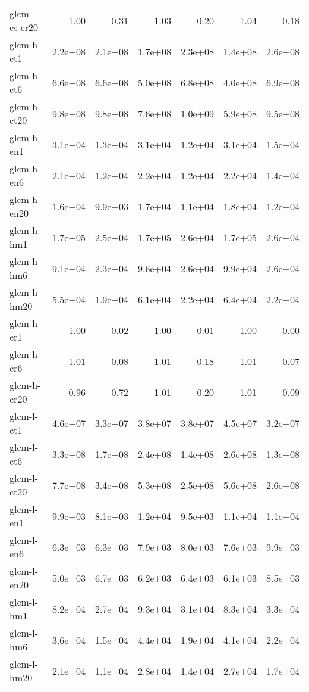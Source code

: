 \begin{tabular}{lrrrrrr}
glcm-cs-cr20        &    1.00 &    0.31 &    1.03 &    0.20 &    1.04 &    0.18 \\
glcm-h-ct1          & 2.2e+08 & 2.1e+08 & 1.7e+08 & 2.3e+08 & 1.4e+08 & 2.6e+08 \\
glcm-h-ct6          & 6.6e+08 & 6.6e+08 & 5.0e+08 & 6.8e+08 & 4.0e+08 & 6.9e+08 \\
glcm-h-ct20         & 9.8e+08 & 9.8e+08 & 7.6e+08 & 1.0e+09 & 5.9e+08 & 9.5e+08 \\
glcm-h-en1          & 3.1e+04 & 1.3e+04 & 3.1e+04 & 1.2e+04 & 3.1e+04 & 1.5e+04 \\
glcm-h-en6          & 2.1e+04 & 1.2e+04 & 2.2e+04 & 1.2e+04 & 2.2e+04 & 1.4e+04 \\
glcm-h-en20         & 1.6e+04 & 9.9e+03 & 1.7e+04 & 1.1e+04 & 1.8e+04 & 1.2e+04 \\
glcm-h-hm1          & 1.7e+05 & 2.5e+04 & 1.7e+05 & 2.6e+04 & 1.7e+05 & 2.6e+04 \\
glcm-h-hm6          & 9.1e+04 & 2.3e+04 & 9.6e+04 & 2.6e+04 & 9.9e+04 & 2.6e+04 \\
glcm-h-hm20         & 5.5e+04 & 1.9e+04 & 6.1e+04 & 2.2e+04 & 6.4e+04 & 2.2e+04 \\
glcm-h-cr1          &    1.00 &    0.02 &    1.00 &    0.01 &    1.00 &    0.00 \\
glcm-h-cr6          &    1.01 &    0.08 &    1.01 &    0.18 &    1.01 &    0.07 \\
glcm-h-cr20         &    0.96 &    0.72 &    1.01 &    0.20 &    1.01 &    0.09 \\
glcm-l-ct1          & 4.6e+07 & 3.3e+07 & 3.8e+07 & 3.8e+07 & 4.5e+07 & 3.2e+07 \\
glcm-l-ct6          & 3.3e+08 & 1.7e+08 & 2.4e+08 & 1.4e+08 & 2.6e+08 & 1.3e+08 \\
glcm-l-ct20         & 7.7e+08 & 3.4e+08 & 5.3e+08 & 2.5e+08 & 5.6e+08 & 2.6e+08 \\
glcm-l-en1          & 9.9e+03 & 8.1e+03 & 1.2e+04 & 9.5e+03 & 1.1e+04 & 1.1e+04 \\
glcm-l-en6          & 6.3e+03 & 6.3e+03 & 7.9e+03 & 8.0e+03 & 7.6e+03 & 9.9e+03 \\
glcm-l-en20         & 5.0e+03 & 6.7e+03 & 6.2e+03 & 6.4e+03 & 6.1e+03 & 8.5e+03 \\
glcm-l-hm1          & 8.2e+04 & 2.7e+04 & 9.3e+04 & 3.1e+04 & 8.3e+04 & 3.3e+04 \\
glcm-l-hm6          & 3.6e+04 & 1.5e+04 & 4.4e+04 & 1.9e+04 & 4.1e+04 & 2.2e+04 \\
glcm-l-hm20         & 2.1e+04 & 1.1e+04 & 2.8e+04 & 1.4e+04 & 2.7e+04 & 1.7e+04 \\

\end{tabular}
